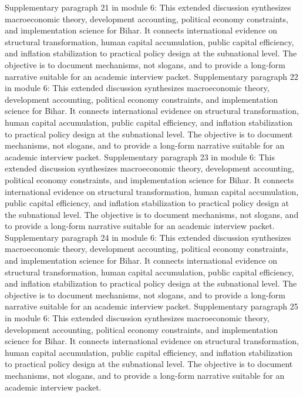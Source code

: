 \documentclass[preprint,12pt]{elsarticle}
\begin{document}
Supplementary paragraph 21 in module 6: This extended discussion synthesizes macroeconomic theory, development accounting, political economy constraints, and implementation science for Bihar. It connects international evidence on structural transformation, human capital accumulation, public capital efficiency, and inflation stabilization to practical policy design at the subnational level. The objective is to document mechanisms, not slogans, and to provide a long-form narrative suitable for an academic interview packet.
Supplementary paragraph 22 in module 6: This extended discussion synthesizes macroeconomic theory, development accounting, political economy constraints, and implementation science for Bihar. It connects international evidence on structural transformation, human capital accumulation, public capital efficiency, and inflation stabilization to practical policy design at the subnational level. The objective is to document mechanisms, not slogans, and to provide a long-form narrative suitable for an academic interview packet.
Supplementary paragraph 23 in module 6: This extended discussion synthesizes macroeconomic theory, development accounting, political economy constraints, and implementation science for Bihar. It connects international evidence on structural transformation, human capital accumulation, public capital efficiency, and inflation stabilization to practical policy design at the subnational level. The objective is to document mechanisms, not slogans, and to provide a long-form narrative suitable for an academic interview packet.
Supplementary paragraph 24 in module 6: This extended discussion synthesizes macroeconomic theory, development accounting, political economy constraints, and implementation science for Bihar. It connects international evidence on structural transformation, human capital accumulation, public capital efficiency, and inflation stabilization to practical policy design at the subnational level. The objective is to document mechanisms, not slogans, and to provide a long-form narrative suitable for an academic interview packet.
Supplementary paragraph 25 in module 6: This extended discussion synthesizes macroeconomic theory, development accounting, political economy constraints, and implementation science for Bihar. It connects international evidence on structural transformation, human capital accumulation, public capital efficiency, and inflation stabilization to practical policy design at the subnational level. The objective is to document mechanisms, not slogans, and to provide a long-form narrative suitable for an academic interview packet.
\end{document}

